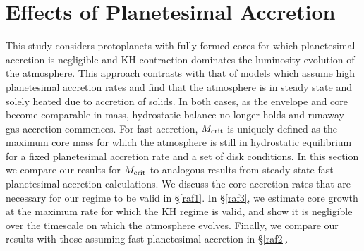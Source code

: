 \section{Effects of Planetesimal Accretion}
\label{acc}



This study considers protoplanets with fully formed cores for which planetesimal accretion is negligible and KH contraction dominates the luminosity evolution of the atmosphere. This approach contrasts with that of models which assume high planetesimal accretion rates and find that the atmosphere is in steady state and solely heated due to accretion of solids. In both cases, as the envelope and core become comparable in mass, hydrostatic balance no longer holds and runaway gas accretion commences. For fast accretion, $M_{\rm crit}$ is uniquely defined as the maximum core mass for which the atmosphere is still in hydrostatic equilibrium for a fixed planetesimal accretion rate and a set of disk conditions. In this section we compare our results for $M_{\rm crit}$ to analogous results from steady-state fast planetesimal accretion calculations. We discuss the core accretion rates that are necessary for our regime to be valid in \S\ref{raf1}. In \S\ref{raf3}, we estimate core growth at the maximum rate for which the KH regime is valid, and show it is negligible over the timescale on which the atmosphere evolves. Finally, we compare our results with those assuming fast planetesimal accretion in \S\ref{raf2}.


